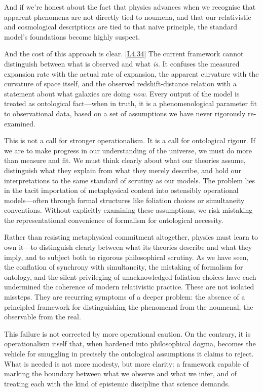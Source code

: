 \documentclass[12pt]{book}
\newcounter{logicanchor}
\newenvironment{logicanchorenv}[1]{\refstepcounter{logicanchor}\label{#1}}{}
\newcommand{\logiclink}[2]{\begin{logicanchorenv}{logic:#1}\end{logicanchorenv}\hyperref[appendix:#1]{[#1]}\xspace}
\begin{document}
And if we're honest about the fact that physics advances when we recognise that apparent phenomena are not directly tied to noumena, and that our relativistic and cosmological descriptions are tied to that naive principle, the standard model's foundations become highly suspect.

And the cost of this approach is clear. \logiclink{L4.34}{} The current framework cannot distinguish between what is observed and what \textit{is}. It confuses the measured expansion rate with the actual rate of expansion, the apparent curvature with the curvature of space itself, and the observed redshift-distance relation with a statement about what galaxies are doing \textit{now}. Every output of the model is treated as ontological fact---when in truth, it is a phenomenological parameter fit to observational data, based on a set of assumptions we have never rigorously re-examined.

This is not a call for stronger operationalism. It is a call for ontological rigour. If we are to make progress in our understanding of the universe, we must do more than measure and fit. We must think clearly about what our theories assume, distinguish what they explain from what they merely describe, and hold our interpretations to the same standard of scrutiny as our models. The problem lies in the tacit importation of metaphysical content into ostensibly operational models---often through formal structures like foliation choices or simultaneity conventions. Without explicitly examining these assumptions, we risk mistaking the representational convenience of formalism for ontological necessity.

Rather than resisting metaphysical commitment altogether, physics must learn to own it---to distinguish clearly between what its theories describe and what they imply, and to subject both to rigorous philosophical scrutiny. As we have seen, the conflation of synchrony with simultaneity, the mistaking of formalism for ontology, and the silent privileging of unacknowledged foliation choices have each undermined the coherence of modern relativistic practice. These are not isolated missteps. They are recurring symptoms of a deeper problem: the absence of a principled framework for distinguishing the phenomenal from the noumenal, the observable from the real.

This failure is not corrected by more operational caution. On the contrary, it is operationalism itself that, when hardened into philosophical dogma, becomes the vehicle for smuggling in precisely the ontological assumptions it claims to reject. What is needed is not more modesty, but more clarity: a framework capable of marking the boundary between what we observe and what we infer, and of treating each with the kind of epistemic discipline that science demands.
\end{document}
